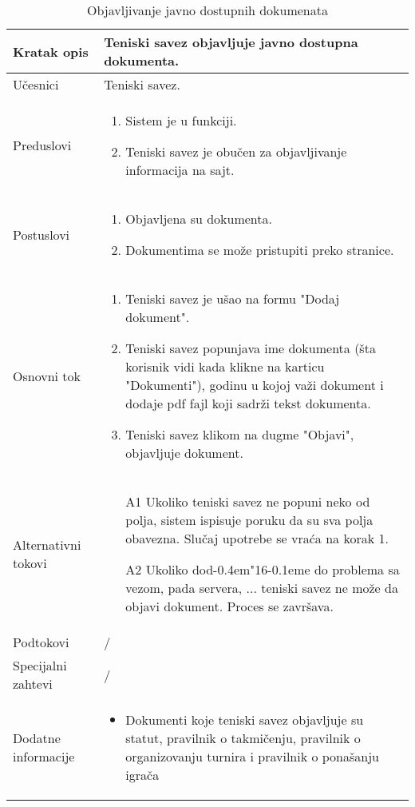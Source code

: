 \documentclass{article}
\begin{document}
\def \dj{d\kern-0.4em\char"16\kern-0.1em}
\def \Dj{\mbox{\raise0.3ex\hbox{-}\kern-0.4em D}}
\begin{longtable}{| p{} | p{} |} 
\hline
    Kratak opis & Teniski savez objavljuje javno dostupna dokumenta.\\ 
\hline    
    U\v{c}esnici & Teniski savez.
    \\
\hline
   Preduslovi & \begin{enumerate}
       \item Sistem je u funkciji.
       \item Teniski savez je obu\v{c}en za objavljivanje informacija na sajt.
   \end{enumerate}\\
\hline  
    Postuslovi & \begin{enumerate}
        \item Objavljena su dokumenta.
        \item Dokumentima se mo\v{z}e pristupiti preko stranice.
    \end{enumerate}\\
\hline
    Osnovni tok & \begin{enumerate}
        \item Teniski savez je u\v{s}ao na formu "Dodaj dokument".
        \item Teniski savez popunjava ime dokumenta (\v{s}ta korisnik vidi kada klikne na karticu "Dokumenti"), godinu u kojoj va\v{z}i dokument i dodaje pdf fajl koji sadr\v{z}i tekst dokumenta.
        \item Teniski savez klikom na dugme "Objavi", objavljuje dokument.
    \end{enumerate}\\
\hline
    Alternativni tokovi & \begin{itemize}
        \item[A1] Ukoliko teniski savez ne popuni neko od polja, sistem ispisuje poruku da su sva polja obavezna. Slu\v{c}aj upotrebe se vra\'{c}a na korak 1.
        \item[A2] Ukoliko do\dj{}e do problema sa vezom, pada servera, ... teniski savez ne mo\v{z}e da objavi dokument. Proces se zavr\v{s}ava.
    \end{itemize}\\
\hline
    Podtokovi & /\\
\hline
    Specijalni zahtevi & /\\
\hline
    Dodatne informacije & \begin{itemize}
        \item Dokumenti koje teniski savez objavljuje su statut, pravilnik o takmi\v{c}enju, pravilnik o organizovanju turnira i pravilnik o pona\v{s}anju igra\v{c}a
    \end{itemize}
\hline
\caption{Objavljivanje javno dostupnih dokumenata} %
\end{longtable}
\end{document}
